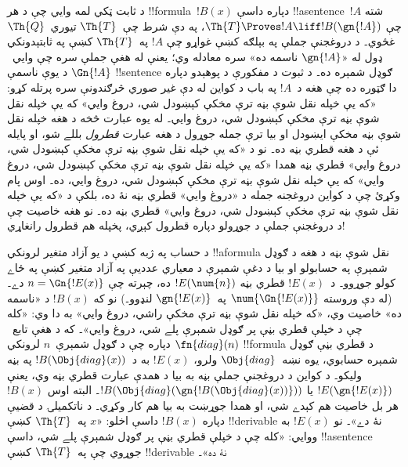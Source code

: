 \documentclass[../../../include/open-logic-section]{subfiles}
\begin{document}


\begin{explain}
د ثابت ټکي لمه وايي چې د هر !!{formula}~$!B(x)$ دپاره داسې
!!a{sentence}~$!A$ شته چې
$\Th{T} \Proves !A \liff !B(\gn{!A})$، په دې شرط چې~$\Th{T}$
تيوري~$\Th{Q}$ غځوي۔ د دروغجنې جملې په بېلګه کښې غواړو چې
$!A$ په~$\Th{T}$ کښې په ثابتېدونکي ډول له «$\gn{!A}$ ناسمه ده»
سره معادله وي؛ يعنې له هغې جملې سره چې وايي~$\Gn{!A}$ د يوې
ناسمې !!{sentence} ګوډل شمېره ده۔ د ثبوت د مفکورې د پوهېدو دپاره
دا ګټوره ده چې هغه د~$!A$ په باب د کواین له دې غير صوري څرګندونې
سره پرتله کړو:
«که يې خپله نقل شوې بڼه ترې مخکې کېښودل شي، دروغ وايي» که يې
خپله نقل شوې بڼه ترې مخکې کېښودل شي، دروغ وايي۔ له يوه عبارت څخه
د هغه خپله نقل شوې بڼه مخکې ايښودل او بيا ترې جمله جوړول د هغه
عبارت \emph{قطرول} بللے شو، او پايله ئې د هغه قطري بڼه ده۔ نو د
«که يې خپله نقل شوې بڼه ترې مخکې کېښودل شي، دروغ وايي» قطري بڼه
همدا «که يې خپله نقل شوې بڼه ترې مخکې کېښودل شي، دروغ وايي» که يې
خپله نقل شوې بڼه ترې مخکې کېښودل شي، دروغ وايي، ده۔ اوس پام وکړئ
چې د کواین دروغجنه جمله د «دروغ وايي» قطري بڼه نۀ ده، بلکې د
«که يې خپله نقل شوې بڼه ترې مخکې کېښودل شي، دروغ وايي» قطري بڼه
ده۔ نو هغه خاصيت چې د دروغجنې جملې د جوړولو دپاره قطرول کېږي،
پخپله هم قطرول رانغاړي!{}

د حساب په ژبه کښې د يو آزاد متغير لرونکي !!a{formula} نقل شوې بڼه
د هغه د ګوډل شمېرې په حسابولو او بيا د دغې شمېرې د معياري عدديې
په آزاد متغير کښې په ځاے کولو جوړوو۔ د~$!E(x)$ قطري بڼه
$!E(\num{n})$ ده، چېرته چې $n = \Gn{!E(x)}$ دے۔ (له دې وروسته
$\num{\Gn{!E(x)}}$ په~$\gn{!E(x)}$ لنډوو۔) نو که $!B(x)$ د
«ناسمه ده» خاصيت وي، «که خپله نقل شوې بڼه ترې مخکې راشي، دروغ وايي»
به دا وي: «کله چې د خپلې قطري بڼې پر ګوډل شمېرې پلے شي، دروغ وايي»۔
که د هغې تابع~$\fn{diag}(n)$ دپاره چې د ګوډل شمېرې~$n$ لرونکي
!!{formula} د قطري بڼې ګوډل شمېره حسابوي، يوه نښه~$\Obj{diag}$
ولرو، $!E(x)$ به د~$!B(\Obj{diag}(x))$ په بڼه وليکو۔ د کواین
د دروغجنې جملې بڼه به بيا د همدې عبارت قطري بڼه وي، يعنې
$!E(\gn{!E(x)})$ يا
$!B(\Obj{diag}(\gn{!B(\Obj{diag}(x))}))$۔ البته اوس $!B(x)$
هر بل خاصيت هم کېدے شي، او همدا جوړښت به بيا هم کار وکړي۔ د
ناتکميلۍ د قضيې دپاره $!B(x)$ داسې اخلو: «$x$ په~$\Th{T}$ کښې
!!{derivable} نۀ دے»۔ نو $!E(x)$ به ووايي: «کله چې د خپلې قطري
بڼې پر ګوډل شمېرې پلے شي، داسې !!a{sentence} جوړوي چې په~$\Th{T}$
کښې !!{derivable} نۀ ده»۔


\end{explain}
\end{document}
